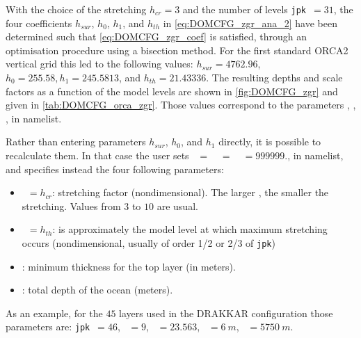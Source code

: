 \documentclass[../main/NEMO_manual]{subfiles}
\begin{document}
With the choice of the stretching $h_{cr} = 3$ and the number of levels \texttt{jpk}~$= 31$,
the four coefficients $h_{sur}$, $h_0$, $h_1$, and $h_{th}$ in
\autoref{eq:DOMCFG_zgr_ana_2} have been determined such that \autoref{eq:DOMCFG_zgr_coef}
is satisfied, through an optimisation procedure using a bisection method.
For the first standard ORCA2 vertical grid this led to the following values:
$h_{sur} = 4762.96$, $h_0 = 255.58, h_1 = 245.5813$, and $h_{th} = 21.43336$.
The resulting depths and scale factors as a function of the model levels are shown in
\autoref{fig:DOMCFG_zgr} and given in \autoref{tab:DOMCFG_orca_zgr}.
Those values correspond to the parameters , , ,  in  namelist.

Rather than entering parameters $h_{sur}$, $h_0$, and $h_1$ directly, it is possible to
recalculate them.  In that case the user sets ~$=$~~$=$~~$=
999999$., in  namelist, and specifies instead the four following parameters:
\begin{itemize}
\item {}~$= h_{cr}$: stretching factor (nondimensional).
  The larger , the smaller the stretching.
  Values from $3$ to $10$ are usual.
\item {}~$= h_{th}$: is approximately the model level at which maximum stretching occurs
  (nondimensional, usually of order 1/2 or 2/3 of \texttt{jpk})
\item {}: minimum thickness for the top layer (in meters).
\item {}: total depth of the ocean (meters).
\end{itemize}

As an example, for the $45$ layers used in the DRAKKAR configuration those parameters are:
\texttt{jpk}~$= 46$, ~$= 9$, ~$= 23.563$, ~$= 6~m$,
~$= 5750~m$.
\end{document}
